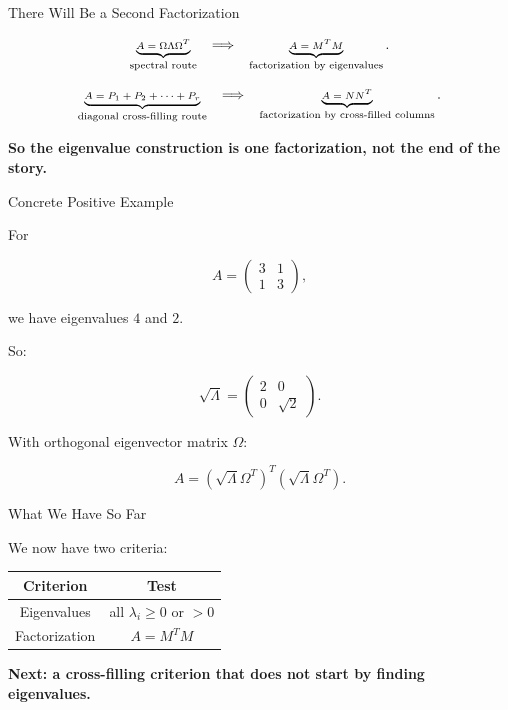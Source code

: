 \documentclass[10pt]{beamer}
\theoremstyle{definition}
\newcommand{\x}[1]{\alert{\textbf{#1}}}
\begin{document}
\begin{frame}{There Will Be a Second Factorization}

\[
\scriptsize
\underbrace{A=\Omega\Lambda\Omega^T}_{\text{spectral route}}
\quad\Longrightarrow\quad
\underbrace{A=M^TM}_{\text{factorization by eigenvalues}}.
\]

\vfill

\[
\scriptsize
\underbrace{A=P_1+P_2+\cdots+P_r}_{\text{diagonal cross-filling route}}
\quad\Longrightarrow\quad
\underbrace{A=NN^T}_{\text{factorization by cross-filled columns}}.
\]

\vfill

\begin{center}
\x{So the eigenvalue construction is one factorization, not the end of the story.}
\end{center}

\end{frame}


\begin{frame}{Concrete Positive Example}

For

$$
A=\begin{pmatrix}3&1\\1&3\end{pmatrix},
$$

we have eigenvalues $4$ and $2$.

\vfill

So:

$$
\sqrt{\Lambda}=
\begin{pmatrix}
2&0\\
0&\sqrt2
\end{pmatrix}.
$$

\vfill

With orthogonal eigenvector matrix $\Omega$:

$$
\boxed{A=(\sqrt{\Lambda}\Omega^T)^T(\sqrt{\Lambda}\Omega^T).}
$$

\end{frame}


\begin{frame}{What We Have So Far}

We now have two criteria:

\vfill

\begin{center}
\renewcommand{\arraystretch}{1.35}
\begin{tabular}{c|c}
\textbf{Criterion} & \textbf{Test}\\
\hline
Eigenvalues & all $\lambda_i\ge0$ or $>0$\\
Factorization & $A=M^TM$
\end{tabular}
\end{center}

\vfill

\begin{center}
\x{Next: a cross-filling criterion that does not start by finding eigenvalues.}
\end{center}

\end{frame}
\end{document}
